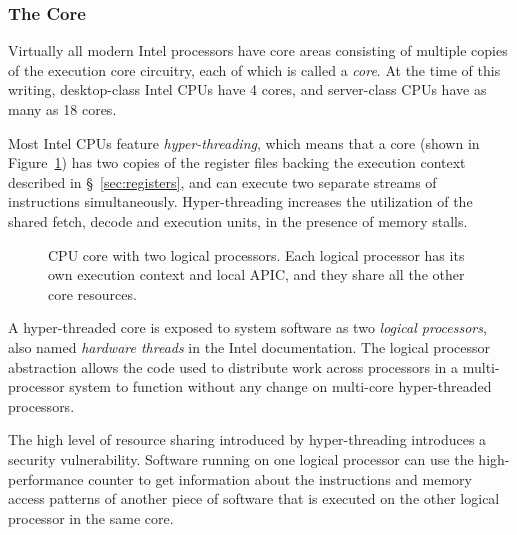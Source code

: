 \subsubsection{The Core}
\label{sec:cpu_core}

Virtually all modern Intel processors have core areas consisting of multiple
copies of the execution core circuitry, each of which is called a
\textit{core}.  At the time of this writing, desktop-class Intel CPUs have 4
cores, and server-class CPUs have as many as 18 cores.

Most Intel CPUs feature \textit{hyper-threading}, which means that a core
(shown in Figure~\ref{fig:cpu_core}) has two copies of the register files
backing the execution context described in \S~\ref{sec:registers}, and can
execute two separate streams of instructions simultaneously. Hyper-threading
increases the utilization of the shared fetch, decode and execution units, in
the presence of memory stalls.

\begin{figure}[hbt]
  \caption{
    CPU core with two logical processors. Each logical processor has its own
    execution context and local APIC, and they share all the other core
    resources.
  }
  \label{fig:cpu_core}
\end{figure}

A hyper-threaded core is exposed to system software as two \textit{logical
processors}, also named \textit{hardware threads} in the Intel documentation.
The logical processor abstraction allows the code used to distribute work
across processors in a multi-processor system to function without any change on
multi-core hyper-threaded processors.

The high level of resource sharing introduced by hyper-threading introduces a
security vulnerability. Software running on one logical processor can use the
high-performance counter \cite{petters1999making} to get information about the
instructions and memory access patterns of another piece of software that is
executed on the other logical processor in the same core.
